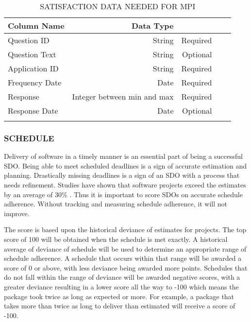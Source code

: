 \documentclass[SDSUThesis.tex]{subfiles}
\begin{document}
            \begin{longtable}{@{}l rr rr}
            
            \toprule%
             \centering%
             {\bfseries Column Name}
             & {\bfseries Data Type}
             &  \\
            
            \cmidrule[0.4pt](r{0.125em}){1-1}%
            \cmidrule[0.4pt](lr{0.125em}){2-2}%
            \cmidrule[0.4pt](l{0.125em}){3-3}%
            \endhead
            
            Question ID & String  & Required \\
            \myrowcolour%
            Question Text & String  & Optional \\
            Application ID & String & Required \\
            \myrowcolour%
            Frequency Date & Date & Required \\
            Response & Integer between min and max  & Required \\
            \myrowcolour%
            Response Date & Date & Optional \\
            
            \bottomrule
            
            \caption{SATISFACTION DATA NEEDED FOR MPI}
            \label{tab:satisfaction}
            \end{longtable}


        \subsubsection{SCHEDULE}  
            Delivery of software in a timely manner is an essential part of being a 
            successful SDO.  Being able to meet scheduled deadlines is a sign of accurate
            estimation and planning.  Drastically missing deadlines is a sign of an SDO
            with a process that needs refinement.  Studies have shown that 
            software projects exceed the estimates by an average of
            30\% \cite{Jorgensen2014}.  Thus it is important to score SDOs on accurate
            schedule adherence. Without tracking and measuring schedule adherence, it will
            not improve.  
            
            The score is based upon the historical deviance of estimates for
            projects.  The top score of
            100 will be obtained when the schedule is met exactly.  A historical average 
            of deviance of schedule will be used to determine an appropriate range
            of schedule adherence.  A schedule that occurs within that range will be awarded
            a score of 0 or above, with less deviance being awarded more points.  Schedules
            that do not fall within the range of deviance will be awarded negative scores, 
            with a greater deviance resulting in a lower score all the way to -100 which means
            the package took twice as long as expected or more.
            For example, a package that takes more than twice as long to deliver than
            estimated will receive a score of -100.
            
\end{document}
